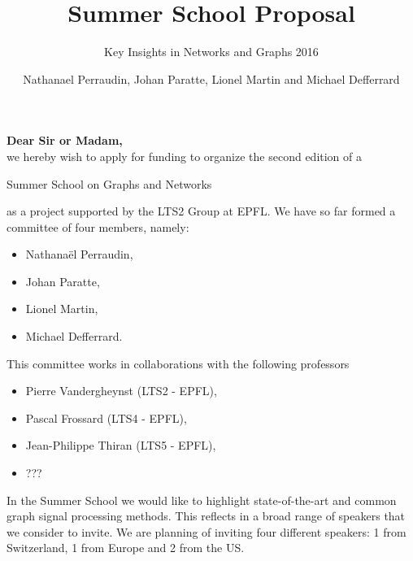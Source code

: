 \documentclass[a4paper]{scrartcl}
\begin{document}
\title{Summer School Proposal}
\subtitle{Key Insights in Networks and Graphs 2016}

\author{Nathanael Perraudin, Johan Paratte, Lionel Martin and Michael Defferrard}

\maketitle




\vspace{2cm}


{\bf{Dear Sir or Madam,}} \\
we hereby wish to apply for funding to organize the second edition of a
\begin{large}
\begin{center}
Summer School on Graphs and Networks
\end{center}
\end{large}
as a project supported by the LTS2 Group at EPFL. We have so far formed a committee of four members, namely:
\begin{itemize}
	\item Nathanaël Perraudin,
	\item Johan Paratte, 
	\item Lionel Martin,
	\item Michael Defferrard.
\end{itemize}

This committee works in collaborations with the following professors
\begin{itemize}
	\item Pierre Vandergheynst (LTS2 - EPFL),
	\item Pascal Frossard (LTS4 - EPFL),
	\item Jean-Philippe Thiran (LTS5 - EPFL),
	\item ???
\end{itemize}

In the Summer School we would like to highlight state-of-the-art and common graph signal processing methods. This reflects in a broad range of speakers that we consider to invite. We are planning of inviting four different speakers: 1 from Switzerland, 1 from Europe and 2 from the US.

\vspace{0.5cm}
\end{document}

